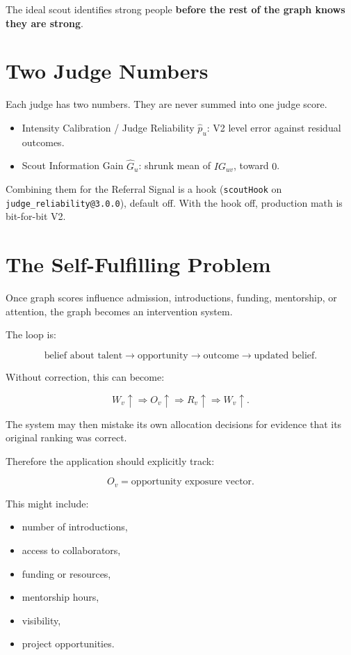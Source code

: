 \documentclass[11pt]{article}
\begin{document}
The ideal scout identifies strong people
\textbf{before the rest of the graph knows they are strong}.

\section{Two Judge Numbers}

Each judge has two numbers. They are never summed into one judge score.

\begin{itemize}
    \item Intensity Calibration / Judge Reliability \(\hat p_u\): V2 level
    error against residual outcomes.
    \item Scout Information Gain \(\hat G_u\): shrunk mean of \(IG_{uv}\),
    toward \(0\).
\end{itemize}

Combining them for the Referral Signal is a hook
(\texttt{scoutHook} on \texttt{judge\_reliability@3.0.0}), default
off. With the hook off, production math is bit-for-bit V2.

\section{The Self-Fulfilling Problem}

Once graph scores influence admission, introductions, funding, mentorship, or
attention, the graph becomes an intervention system.

The loop is:

\[
\text{belief about talent}
\rightarrow
\text{opportunity}
\rightarrow
\text{outcome}
\rightarrow
\text{updated belief}.
\]

Without correction, this can become:

\[
W_v \uparrow
\Rightarrow
O_v \uparrow
\Rightarrow
R_v \uparrow
\Rightarrow
W_v \uparrow.
\]

The system may then mistake its own allocation decisions for evidence that its
original ranking was correct.

Therefore the application should explicitly track:

\[
O_v
=
\text{opportunity exposure vector}.
\]

This might include:

\begin{itemize}
    \item number of introductions,
    \item access to collaborators,
    \item funding or resources,
    \item mentorship hours,
    \item visibility,
    \item project opportunities.
\end{itemize}
\end{document}
